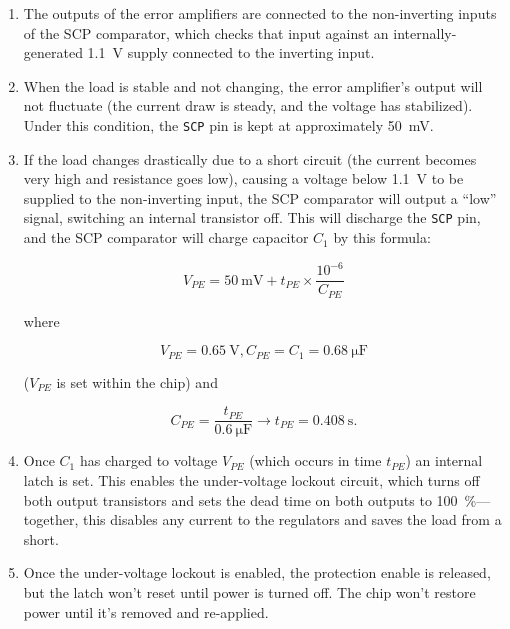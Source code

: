 \documentclass{article}
\newcommand{\chippin}{\texttt}
\begin{document}
\begin{enumerate}
\item The outputs of the error amplifiers are connected to the
  non-inverting inputs of the SCP comparator, which checks that input
  against an internally-generated \qty{1.1}{\volt} supply connected to
  the inverting input.
\item When the load is stable and not changing, the error amplifier's
  output will not fluctuate (the current draw is steady, and the
  voltage has stabilized). Under this condition, the \chippin{SCP} pin
  is kept at approximately \qty{50}{\milli\volt}.
\item If the load changes drastically due to a short circuit (the
  current becomes very high and resistance goes low), causing a
  voltage below \qty{1.1}{\volt} to be supplied to the non-inverting
  input, the SCP comparator will output a ``low'' signal, switching an
  internal transistor off. This will discharge the \chippin{SCP} pin,
  and the SCP comparator will charge capacitor $C_1$ by this formula:

\begin{displaymath}
  V_{PE} = \qty{50}{\milli\volt} + t_{PE} \times
  \frac{10^{-6}}{C_{PE}}
\end{displaymath}

\noindent
where

\begin{displaymath}
  V_{PE} = \qty{0.65}{\volt}, C_{PE} = C_1 = \qty{0.68}{\micro\farad}
\end{displaymath}

($V_{PE}$ is set within the chip) and

\begin{displaymath}
  C_{PE} = \frac{t_{PE}}{\qty{0.6}{\micro\farad}}
  \rightarrow{} t_{PE} = \qty{0.408}{\second}.
\end{displaymath}

\item Once $C_1$ has charged to voltage $V_{PE}$ (which occurs in time
  $t_{PE}$) an internal latch is set. This enables the under-voltage
  lockout circuit, which turns off both output transistors and sets
  the dead time on both outputs to \qty{100}{\%}---together, this
  disables any current to the regulators and saves the load from a
  short.
\item Once the under-voltage lockout is enabled, the protection enable
  is released, but the latch won't reset until power is turned
  off. The chip won't restore power until it's removed and re-applied.
\end{enumerate}
\end{document}

